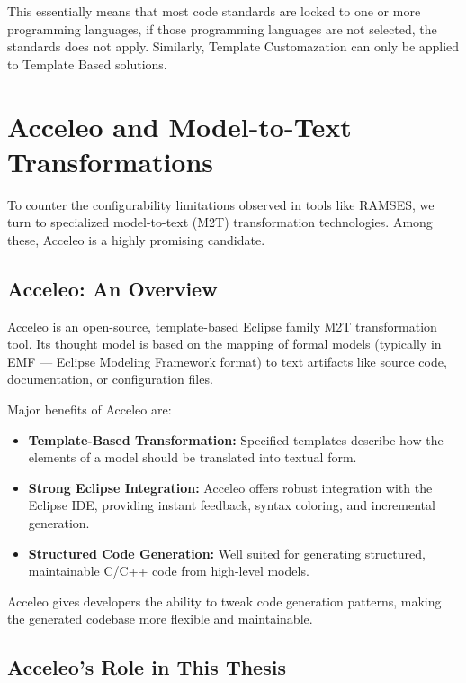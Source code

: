 This essentially means that most code standards are locked to one or more programming languages, if those programming languages are not selected, the standards does not apply. Similarly, Template Customazation can only be applied to Template Based solutions.

\section{Acceleo and Model-to-Text Transformations} \label{sec:folders_and_files}

To counter the configurability limitations observed in tools like RAMSES, we turn to specialized model-to-text (M2T) transformation technologies. Among these, Acceleo is a highly promising candidate.

\subsection*{Acceleo: An Overview}

Acceleo is an open-source, template-based Eclipse family M2T transformation tool. Its thought model is based on the mapping of formal models (typically in EMF — Eclipse Modeling Framework format) to text artifacts like source code, documentation, or configuration files.

Major benefits of Acceleo are: 
\begin{itemize} 
	\item \textbf{Template-Based Transformation:} Specified templates describe how the elements of a model should be translated into textual form.
	\item \textbf{Strong Eclipse Integration:} Acceleo offers robust integration with the Eclipse IDE, providing instant feedback, syntax coloring, and incremental generation.
	\item \textbf{Structured Code Generation:} Well suited for generating structured, maintainable C/C++ code from high-level models.
\end{itemize}

\begin{tcolorbox}[colback=blue!5, colframe=blue!40!black] Acceleo gives developers the ability to tweak code generation patterns, making the generated codebase more flexible and maintainable. \end{tcolorbox}

\subsection*{Acceleo’s Role in This Thesis}

